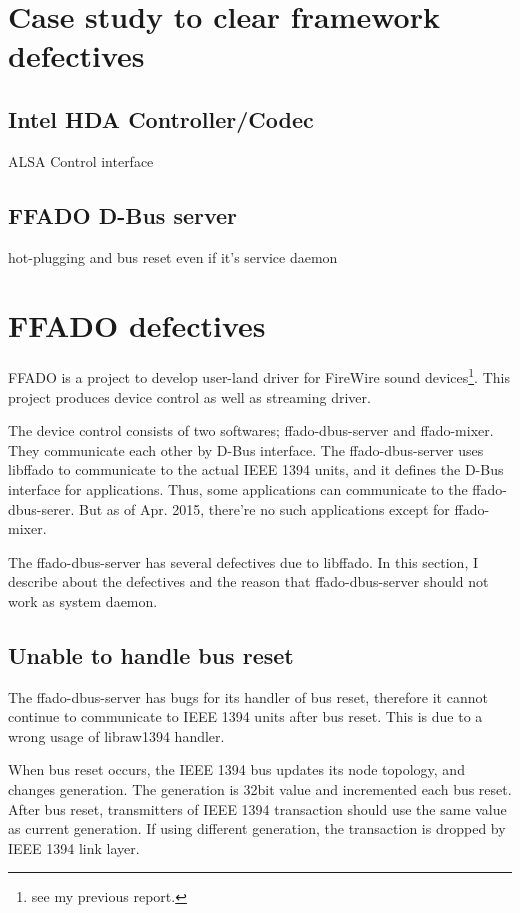 \documentclass[onecolumn]{article}
\begin{document}
\section{Case study to clear framework defectives}

\subsection{Intel HDA Controller/Codec}

ALSA Control interface

\subsection{FFADO D-Bus server}

hot-plugging and bus reset even if it's service daemon


\section{FFADO defectives}

FFADO is a project to develop user-land driver for FireWire sound devices\footnote{see my previous report.}. This project produces device control as well as streaming driver.

The device control consists of two softwares; ffado-dbus-server and ffado-mixer. They communicate each other by D-Bus interface. The ffado-dbus-server uses libffado to communicate to the actual IEEE 1394 units, and it defines the D-Bus interface for applications. Thus, some applications can communicate to the ffado-dbus-serer. But as of Apr. 2015, there're no such applications except for ffado-mixer.

The ffado-dbus-server has several defectives due to libffado. In this section, I describe about the defectives and the reason that ffado-dbus-server should not work as system daemon.

\subsection{Unable to handle bus reset}

The ffado-dbus-server has bugs for its handler of bus reset, therefore it cannot continue to communicate to IEEE 1394 units after bus reset. This is due to a wrong usage of libraw1394 handler.

When bus reset occurs, the IEEE 1394 bus updates its node topology, and changes generation. The generation is 32bit value and incremented each bus reset. After bus reset, transmitters of IEEE 1394 transaction should use the same value as current generation. If using different generation, the transaction is dropped by IEEE 1394 link layer.
\end{document}
